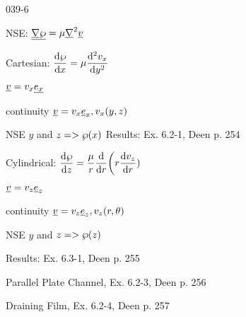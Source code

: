 \begin{mitframe}{039-6}

            
\begin{listone}

\item NSE: $\uline{\gradop}\uline{\dynpress}=\chempot\gradop^2\uline{\vvel}$
		
\item Cartesian: $\dfrac{\mathrm{d}\dynpress}{\mathrm{d}\disp}=\chempot\dfrac{\mathrm{d}^2\vvel_{\disp}}{\mathrm{d}y^2}$

				\begin{listtwo}
                
                \item $\uline{\vvel}=\vvel_{\disp}\uline{\e_{\disp}}$
                
                \item continuity $\uline{\vvel}=\vvel_{\disp}\mcef_{\disp}, \vvel_{\disp}(y,z)$
                
                \item NSE $y$ and $z=>\dynpress(\disp)$
                Results: Ex. 6.2-1, Deen p. 254
                
                \end{listtwo}
                
\item Cylindrical: $\dfrac{\mathrm{d}\dynpress}{\mathrm{d}z}=\dfrac{\chempot}{\pos}\dfrac{\mathrm{d}}{\mathrm{d}\pos}\bigg(\pos\dfrac{\mathrm{d}\vvel_z}{\mathrm{d}\pos})$

				\begin{listtwo}
                
                \item $\uline{\vvel}=\vvel_z\uline\e_z$
                
                \item continuity $\uline{\vvel}=\vvel_z\uline\e_z, \vvel_z(\pos,\theta)$
                
                \item NSE $y$ and $z=>\dynpress(z)$
                
                \item Results: Ex. 6.3-1, Deen p. 255
                
                \end{listtwo}

\item Parallel Plate Channel, Ex. 6.2-3, Deen p. 256
\item Draining Film, Ex. 6.2-4, Deen p. 257
\end{listone}
\end{mitframe}